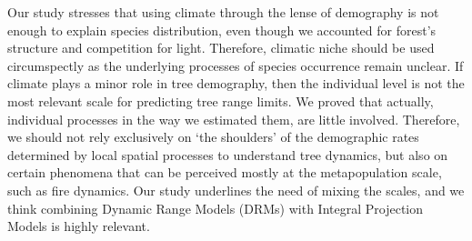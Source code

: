 Our study stresses that using climate through the lense of demography is not enough to explain species distribution, even though we accounted for forest's structure and competition for light. Therefore, climatic niche should be used circumspectly as the underlying processes of species occurrence remain unclear. If climate plays a minor role in tree demography, then the individual level is not the most relevant scale for predicting tree range limits. We proved that actually, individual processes in the way we estimated them, are little involved. Therefore, we should not rely exclusively on `the shoulders' of the demographic rates determined by local spatial processes to understand tree dynamics, but also on certain phenomena that can be perceived mostly at the metapopulation scale, such as fire dynamics. Our study underlines the need of mixing the scales, and we think combining Dynamic Range Models (DRMs) with Integral Projection Models is highly relevant.